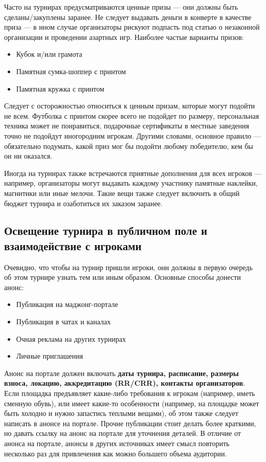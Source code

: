 Часто на турнирах предусматриваются ценные призы --- они должны быть сделаны/закуплены заранее. Не следует выдавать деньги в конверте в качестве приза --- в ином случае организаторы рискуют подпасть под статью о незаконной организации и проведении азартных игр. Наиболее частые варианты призов:
\begin{itemize}
	\item Кубок и/или грамота
	\item Памятная сумка-шоппер с принтом
	\item Памятная кружка с принтом
\end{itemize}

Следует с осторожностью относиться к ценным призам, которые могут подойти не всем. Футболка с принтом скорее всего не подойдет по размеру, персональная техника может не понравиться, подарочные сертификаты в местные заведения точно не подойдут иногородним игрокам. Другими словами, основное правило --- обязательно подумать, какой приз мог бы подойти любому победителю, кем бы он ни оказался.

Иногда на турнирах также встречаются приятные дополнения для всех игроков --- например, организаторы могут выдавать каждому участнику памятные наклейки, магнитики или иные мелочи. Такие вещи также следует включить в общий бюджет турнира и озаботиться их заказом заранее.

\subsection{Освещение турнира в публичном поле и взаимодействие с игроками}

Очевидно, что чтобы на турнир пришли игроки, они должны в первую очередь об этом турнире узнать тем или иным образом. Основные способы донести анонс:
\begin{itemize}
	\item Публикация на маджонг-портале
	\item Публикация в чатах и каналах
	\item Очная реклама на других турнирах
	\item Личные приглашения
\end{itemize}

Анонс на портале должен включать \textbf{даты турнира, расписание, размеры взноса, локацию, аккредитацию (RR/CRR), контакты организаторов}. Если площадка предъявляет какие-либо требования к игрокам (например, иметь сменную обувь), или имеет какие-то особенности (например, на площадке может быть холодно и нужно запастись теплыми вещами), об этом также следует написать в анонсе на портале. Прочие публикации стоит делать более краткими, но давать ссылку на анонс на портале для уточнения деталей. В отличие от анонса на портале, анонсы в других источниках имеет смысл повторить несколько раз для привлечения как можно большего объема аудитории.

